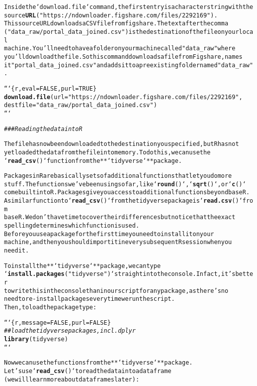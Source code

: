 \documentclass{article}\usepackage[]{graphicx}\usepackage[]{xcolor}
\makeatletter
\newcommand{\hlstr}[1]{\textcolor[rgb]{0.192,0.494,0.8}{#1}}%
\newcommand{\hlcom}[1]{\textcolor[rgb]{0.678,0.584,0.686}{\textit{#1}}}%
\newcommand{\hlkwd}[1]{\textcolor[rgb]{0.737,0.353,0.396}{\textbf{#1}}}%
\newenvironment{kframe}{%
 \def\at@end@of@kframe{}%
 \ifinner\ifhmode%
  \def\at@end@of@kframe{\end{minipage}}%
  \begin{minipage}{\columnwidth}%
 \fi\fi%
 \def\FrameCommand##1{\hskip\@totalleftmargin \hskip-\fboxsep
 \colorbox{shadecolor}{##1}\hskip-\fboxsep
     \hskip-\linewidth \hskip-\@totalleftmargin \hskip\columnwidth}%
 \MakeFramed {\advance\hsize-\width
   \@totalleftmargin\z@ \linewidth\hsize
   \@setminipage}}%
 {\par\unskip\endMakeFramed%
 \at@end@of@kframe}
\newenvironment{knitrout}{}{} %
\makeatother
\begin{document}
\begin{knitrout}
\begin{kframe}
\begin{alltt}
Inside the `download.file` command, the first entry is a character string with the
source \hlkwd{URL} (\hlstr{"https://ndownloader.figshare.com/files/2292169"}). 
This source URL downloads a CSV file from figshare. The text after the comma
(\hlstr{"data_raw/portal_data_joined.csv"}) is the destination of the file on your local
machine. You'll need to have a folder on your machine called \hlstr{"data_raw"} where 
you'll download the file. So this command downloads a file from Figshare, names 
it \hlstr{"portal_data_joined.csv"} and adds it to a preexisting folder named \hlstr{"data_raw"}.

```\{r, eval=FALSE, purl=TRUE\}
\hlkwd{download.file}(url = \hlstr{"https://ndownloader.figshare.com/files/2292169"},
              destfile = \hlstr{"data_raw/portal_data_joined.csv"})
```


\hlcom{### Reading the data into R}

The file has now been downloaded to the destination you specified, but R has not 
yet loaded the data from the file into memory. To do this, we can use the 
`\hlkwd{read_csv}()` function from the **`tidyverse`** package. 

Packages in R are basically sets of additional functions that let you do more
stuff. The functions we've been using so far, like `\hlkwd{round}()`, `\hlkwd{sqrt}()`, or `\hlkwd{c}()`
come built into R. Packages give you access to additional functions beyond base R. 
A similar function to `\hlkwd{read_csv}()` from the tidyverse package is `\hlkwd{read.csv}()` from 
base R. We don't have time to cover their differences but notice that the exact 
spelling determines which function is used.
Before you use a package for the first time you need to install it on your 
machine, and then you should import it in every subsequent R session when you 
need it. 

To install the **`tidyverse`** package, we can type 
`\hlkwd{install.packages}(\hlstr{"tidyverse"})` straight into the console. In fact, it's better 
to write this in the console than in our script for any package, as there's no 
need to re-install packages every time we run the script. 
Then, to load the package type:

```\{r, message = FALSE, purl = FALSE\}
\hlcom{## load the tidyverse packages, incl. dplyr}
\hlkwd{library}(tidyverse)
```

Now we can use the functions from the **`tidyverse`** package. 
Let's use `\hlkwd{read_csv}()` to read the data into a data frame 
(we will learn more about data frames later):


\end{alltt}
\end{kframe}
\end{knitrout}
\end{document}
